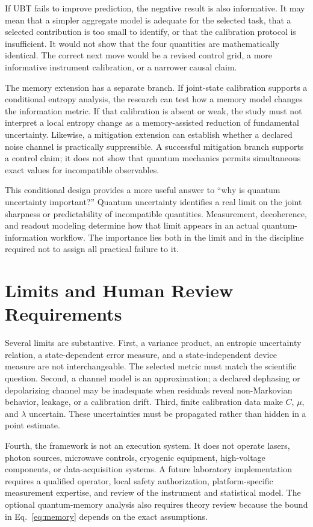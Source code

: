 \documentclass[conference]{../../../../Conference-LaTeX-template_10-17-19/IEEEtran}
\begin{document}
If UBT fails to improve prediction, the negative result is also informative. It may mean that a simpler aggregate model is adequate for the selected task, that a selected contribution is too small to identify, or that the calibration protocol is insufficient. It would not show that the four quantities are mathematically identical. The correct next move would be a revised control grid, a more informative instrument calibration, or a narrower causal claim.

The memory extension has a separate branch. If joint-state calibration supports a conditional entropy analysis, the research can test how a memory model changes the information metric. If that calibration is absent or weak, the study must not interpret a local entropy change as a memory-assisted reduction of fundamental uncertainty. Likewise, a mitigation extension can establish whether a declared noise channel is practically suppressible. A successful mitigation branch supports a control claim; it does not show that quantum mechanics permits simultaneous exact values for incompatible observables.

This conditional design provides a more useful answer to ``why is quantum uncertainty important?'' Quantum uncertainty identifies a real limit on the joint sharpness or predictability of incompatible quantities. Measurement, decoherence, and readout modeling determine how that limit appears in an actual quantum-information workflow. The importance lies both in the limit and in the discipline required not to assign all practical failure to it.

\section{Limits and Human Review Requirements}

Several limits are substantive. First, a variance product, an entropic uncertainty relation, a state-dependent error measure, and a state-independent device measure are not interchangeable. The selected metric must match the scientific question. Second, a channel model is an approximation; a declared dephasing or depolarizing channel may be inadequate when residuals reveal non-Markovian behavior, leakage, or a calibration drift. Third, finite calibration data make $C$, $\mu$, and $\lambda$ uncertain. These uncertainties must be propagated rather than hidden in a point estimate.

Fourth, the framework is not an execution system. It does not operate lasers, photon sources, microwave controls, cryogenic equipment, high-voltage components, or data-acquisition systems. A future laboratory implementation requires a qualified operator, local safety authorization, platform-specific measurement expertise, and review of the instrument and statistical model. The optional quantum-memory analysis also requires theory review because the bound in Eq.~\eqref{eq:memory} depends on the exact assumptions.
\end{document}
